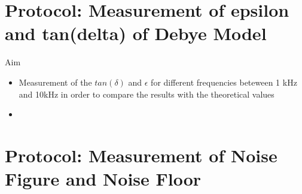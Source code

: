 \section{Protocol: Measurement of epsilon and tan(delta) of Debye Model}
\large{Aim} \\
\begin{itemize}
\item Measurement of the $tan(\delta)$ and $\epsilon$ for different frequencies beteween 1 kHz and 10kHz in order to compare the results with the theoretical values
\item  
\end{itemize}

\section{Protocol: Measurement of Noise Figure and Noise Floor}